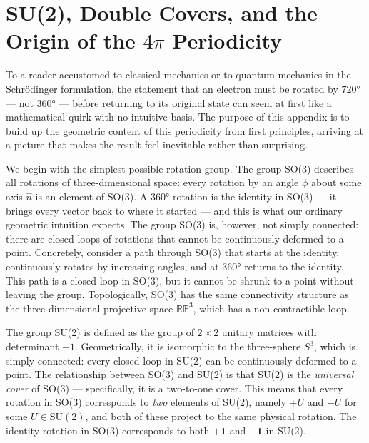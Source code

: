 \documentclass[%
 reprint,
 amsmath,amssymb,
 aps,
 prb,
]{revtex4-2}
\numberwithin{equation}{section}
\begin{document}
\section{SU(2), Double Covers, and the Origin of the $4\pi$ Periodicity}
\label{app:su2}

To a reader accustomed to classical mechanics or to quantum mechanics in the Schrödinger formulation, the statement that an electron must be rotated by $720°$ --- not $360°$ --- before returning to its original state can seem at first like a mathematical quirk with no intuitive basis. The purpose of this appendix is to build up the geometric content of this periodicity from first principles, arriving at a picture that makes the result feel inevitable rather than surprising.

We begin with the simplest possible rotation group. The group SO(3) describes all rotations of three-dimensional space: every rotation by an angle $\phi$ about some axis $\hat{n}$ is an element of SO(3). A $360°$ rotation is the identity in SO(3) --- it brings every vector back to where it started --- and this is what our ordinary geometric intuition expects. The group SO(3) is, however, not simply connected: there are closed loops of rotations that cannot be continuously deformed to a point. Concretely, consider a path through SO(3) that starts at the identity, continuously rotates by increasing angles, and at $360°$ returns to the identity. This path is a closed loop in SO(3), but it cannot be shrunk to a point without leaving the group. Topologically, SO(3) has the same connectivity structure as the three-dimensional projective space $\mathbb{RP}^3$, which has a non-contractible loop.

The group SU(2) is defined as the group of $2\times 2$ unitary matrices with determinant $+1$. Geometrically, it is isomorphic to the three-sphere $S^3$, which is simply connected: every closed loop in SU(2) can be continuously deformed to a point. The relationship between SO(3) and SU(2) is that SU(2) is the \emph{universal cover} of SO(3) --- specifically, it is a two-to-one cover. This means that every rotation in SO(3) corresponds to \emph{two} elements of SU(2), namely $+U$ and $-U$ for some $U \in \mathrm{SU}(2)$, and both of these project to the same physical rotation. The identity rotation in SO(3) corresponds to both $+\mathbf{1}$ and $-\mathbf{1}$ in SU(2).
\end{document}
